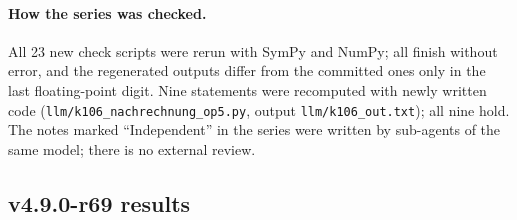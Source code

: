 \paragraph{How the series was checked.}
All 23 new check scripts were rerun with SymPy and NumPy; all finish without error, and the regenerated outputs differ from the committed ones only in the
last floating-point digit.  Nine statements were recomputed with newly written code (\texttt{llm/k106\_nachrechnung\_op5.py}, output
\texttt{llm/k106\_out.txt}); all nine hold.  The notes marked ``Independent'' in the series were written by sub-agents of the same model; there is no
external review.

\subsection*{v4.9.0-r69 results}
\label{subsec:v490-r69-results}

